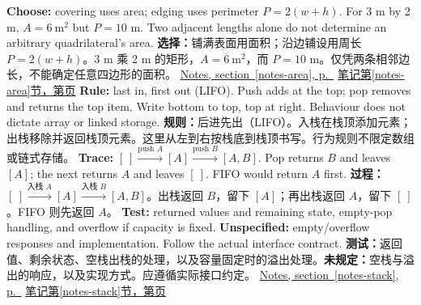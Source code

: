  {\textbf{Choose:} covering uses area; edging uses perimeter $P=2(w+h)$. For 3 m by 2 m, $A=6\ \mathrm{m^2}$ but $P=10$ m. Two adjacent lengths alone do not determine an arbitrary quadrilateral's area.}
 {\textbf{选择：}铺满表面用面积；沿边铺设用周长 $P=2(w+h)$。3 m 乘 2 m 的矩形，$A=6\ \mathrm{m^2}$，而 $P=10$ m。仅凭两条相邻边长，不能确定任意四边形的面积。}
 {\hyperref[notes-area]{Notes, section~\ref*{notes-area}, p.~\pageref*{notes-area}}}
 {\hyperref[notes-area]{笔记第\ref*{notes-area}节，第\pageref*{notes-area}页}}
 {\textbf{Rule:} last in, first out (LIFO). Push adds at the top; pop removes and returns the top item. Write bottom to top, top at right. Behaviour does not dictate array or linked storage.}
 {\textbf{规则：}后进先出（LIFO）。入栈在栈顶添加元素；出栈移除并返回栈顶元素。这里从左到右按栈底到栈顶书写。行为规则不限定数组或链式存储。}
 {\textbf{Trace:} $[\ ]\xrightarrow{\text{push }A}[A]\xrightarrow{\text{push }B}[A,B]$. Pop returns $B$ and leaves $[A]$; the next returns $A$ and leaves $[\ ]$. FIFO would return $A$ first.}
 {\textbf{过程：}$[\ ]\xrightarrow{\text{入栈 }A}[A]\xrightarrow{\text{入栈 }B}[A,B]$。出栈返回 $B$，留下 $[A]$；再出栈返回 $A$，留下 $[\ ]$。FIFO 则先返回 $A$。}
 {\textbf{Test:} returned values and remaining state, empty-pop handling, and overflow if capacity is fixed. \textbf{Unspecified:} empty/overflow responses and implementation. Follow the actual interface contract.}
 {\textbf{测试：}返回值、剩余状态、空栈出栈的处理，以及容量固定时的溢出处理。\textbf{未规定：}空栈与溢出的响应，以及实现方式。应遵循实际接口约定。}
 {\hyperref[notes-stack]{Notes, section~\ref*{notes-stack}, p.~\pageref*{notes-stack}}}
 {\hyperref[notes-stack]{笔记第\ref*{notes-stack}节，第\pageref*{notes-stack}页}}
